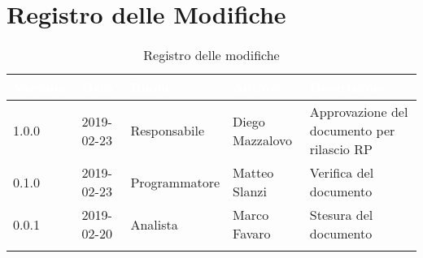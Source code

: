 \newpage

\section*{Registro delle Modifiche}

\begin{center}
\begin{longtable}[c]{|m{}|m{}|m{}|m{}|p{}|}
\hline
\rowcolor{bluelogo}\textbf{\textcolor{white}{Versione}} & \textbf{\textcolor{white}{Data}} & \textbf{\textcolor{white}{Ruolo}} & \textbf{\textcolor{white}{Autore}} & \textbf{\textcolor{white}{Descrizione}}\\
\hline 
\endfirsthead
1.0.0 & 2019-02-23 & Responsabile & Diego Mazzalovo & Approvazione del documento per rilascio RP\\
\hline
\rowcolor{grigio} 0.1.0 & 2019-02-23 & Programmatore & Matteo Slanzi & Verifica del documento \\
\hline
0.0.1 & 2019-02-20 & Analista & Marco Favaro & Stesura del documento \\
\hline
\caption{Registro delle modifiche}
\end{longtable}
\end{center}

